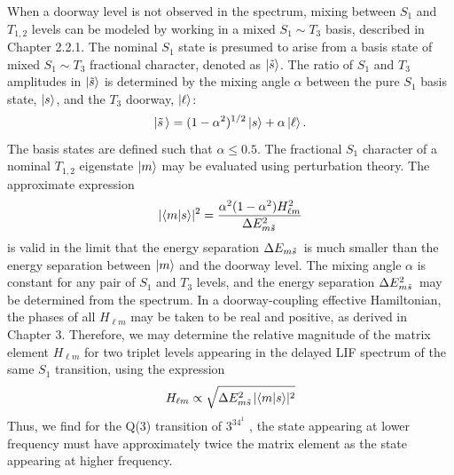 \documentclass[12pt]{mitthesis}
\begin{document}
When a doorway level is not observed in the spectrum, mixing between
$S_1$ and $T_{1,2}$ levels can be modeled by working in a mixed $S_1
\sim T_3$ basis, described in Chapter 2.2.1.  The nominal $S_1$ state
is presumed to arise from a basis state of mixed $S_1 \sim T_3$
fractional character, denoted as $\mathinner{|{\tilde{s}}\rangle}$.  The ratio of
$S_1$ and $T_3$ amplitudes in $\mathinner{|{\tilde{s}}\rangle}$ is determined by the
mixing angle $\alpha$ between the pure $S_1$ basis state, $\mathinner{|{s}\rangle}$,
and the $T_3$ doorway, $\mathinner{|{\ell}\rangle}$:
\begin{equation}
  \mathinner{|{\tilde{s}\,}\rangle} = (1-\alpha^2)^{1/2} \mathinner{|{s}\rangle} + \alpha \mathinner{|{\ell}\rangle}.
\end{equation}
The basis states are defined such that $\alpha \leq 0.5$.
The fractional $S_1$ character of a nominal $T_{1,2}$ eigenstate
$\mathinner{|{m}\rangle}$ may be evaluated using perturbation theory.  The approximate expression
\begin{equation}
  \lvert \mathinner{\langle{m|s}\rangle} \rvert^2 = 
  \frac{\alpha^2 (1-\alpha^2) H_{\ell m}^2}{\Delta E_{m \tilde{s}\,}^2}
\end{equation}
is valid in the limit that the energy separation $\Delta E_{m \tilde{s}\,}$ is
much smaller than the energy separation between $\mathinner{|{m}\rangle}$ and the
doorway level.  The mixing angle $\alpha$ is constant for any
pair of $S_1$ and $T_3$ levels, and the energy separation $\Delta E_{m
  \tilde{s}\,}^2$ may be determined from the spectrum.  In a doorway-coupling
effective Hamiltonian, the phases of all $H_{\ell m}$ may be taken to
be real and positive, as derived in Chapter 3.  Therefore, we may
determine the relative magnitude of the matrix element $H_{\ell m}$
for two triplet levels appearing in the delayed LIF spectrum of
the same $S_1$ transition, using the expression
\begin{equation}
  H_{\ell m} \propto \sqrt{ \Delta E_{m \tilde{s}\,}^2 \lvert \mathinner{\langle{m|s}\rangle} \rvert^2 }
\end{equation}
Thus, we find for the Q(3) transition of $3^34^1$ , the state
appearing at lower frequency must have approximately twice the matrix
element as the state appearing at higher frequency.
\end{document}
